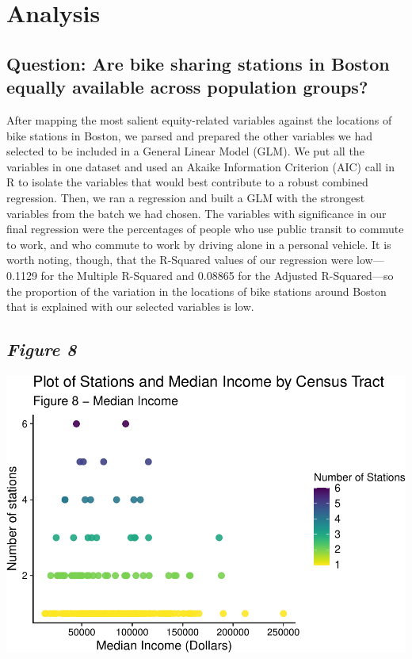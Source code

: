 \documentclass[
  12pt,
]{article}
\begin{document}
\newpage

\hypertarget{analysis}{%
\section{Analysis}\label{analysis}}

\hypertarget{question-are-bike-sharing-stations-in-boston-equally-available-across-population-groups}{%
\subsection{Question: Are bike sharing stations in Boston equally
available across population
groups?}\label{question-are-bike-sharing-stations-in-boston-equally-available-across-population-groups}}

After mapping the most salient equity-related variables against the
locations of bike stations in Boston, we parsed and prepared the other
variables we had selected to be included in a General Linear Model
(GLM). We put all the variables in one dataset and used an Akaike
Information Criterion (AIC) call in R to isolate the variables that
would best contribute to a robust combined regression. Then, we ran a
regression and built a GLM with the strongest variables from the batch
we had chosen. The variables with significance in our final regression
were the percentages of people who use public transit to commute to
work, and who commute to work by driving alone in a personal vehicle. It
is worth noting, though, that the R-Squared values of our regression
were low--- 0.1129 for the Multiple R-Squared and 0.08865 for the
Adjusted R-Squared---so the proportion of the variation in the locations
of bike stations around Boston that is explained with our selected
variables is low.

\hypertarget{figure-8}{%
\subsection{\texorpdfstring{\emph{Figure 8}}{Figure 8}}\label{figure-8}}

\includegraphics{Project_Template_files/figure-latex/data scatterplots income-1.pdf}
\newpage
\end{document}
